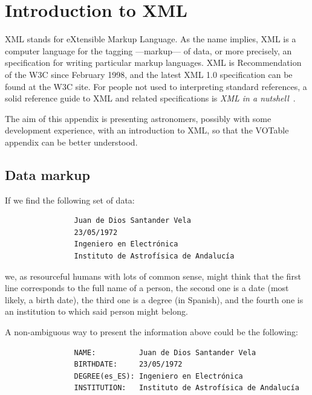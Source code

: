 \chapter{Introduction to XML} %
\label{cha:introduction_to_xml}

	XML stands for eXtensible Markup Language. As the name implies,
	XML is a computer language for the tagging ---markup--- of
	data, or more precisely, an specification for writing
	particular markup languages. XML is Recommendation of the W3C
	since February 1998, and the latest XML 1.0 specification can
	be found at the W3C
	site. For people not
	used to interpreting standard references, a solid reference
	guide to XML and related specifications is \emph{XML in a
	nutshell}~\cite{XML.Harold:2002dq}.
	
	The aim of this appendix is presenting astronomers, possibly
	with some development experience, with an introduction to XML,
	so that the VOTable appendix can be better understood.

	\section{Data markup} %
	\label{sec:data_markup}
		
		If we find the following set of data:
		
		\begin{adjustwidth}{0.1\columnwidth}{0.1\columnwidth}
			\begin{verbatim}
				Juan de Dios Santander Vela
				23/05/1972
				Ingeniero en Electrónica
				Instituto de Astrofísica de Andalucía
			\end{verbatim}
		\end{adjustwidth}
		
		\noindent we, as resourceful humans with lots of common
		sense, might think that the first line corresponds to the
		full name of a person, the second one is a date (most
		likely, a birth date), the third one is a degree (in
		Spanish), and the fourth one is an institution to which
		said person might belong.
		
		A non-ambiguous way to present the information above could
		be the following:
		
		\begin{adjustwidth}{0.1\columnwidth}{0.1\columnwidth}
			\begin{verbatim}
				NAME:          Juan de Dios Santander Vela
				BIRTHDATE:     23/05/1972
				DEGREE(es_ES): Ingeniero en Electrónica
				INSTITUTION:   Instituto de Astrofísica de Andalucía
			\end{verbatim}
		\end{adjustwidth}
		
